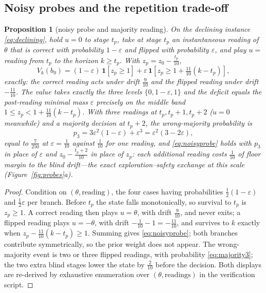 \documentclass[11pt,a4paper]{article}
\theoremstyle{plain}
\newtheorem{proposition}[theorem]{Proposition}
\theoremstyle{definition}
\theoremstyle{remark}
\newcommand{\ind}[1]{\mathbf{1}[#1]}
\newcommand{\tfr}[2]{\tfrac{#1}{#2}}
\begin{document}
\subsection{Noisy probes and the repetition trade-off}

\begin{proposition}[noisy probe and majority reading]\label{prop:noisyprobe}
On the declining instance \eqref{eq:declining}, hold $u=0$ to stage $t_p$, take at stage $t_p$ an instantaneous reading of $\theta$ that is correct with probability $1-\varepsilon$ and flipped with probability $\varepsilon$, and play $u=$ reading from $t_p$ to the horizon $k\ge t_p$. With $z_p=z_0-\tfr{t_p}{10}$,
\begin{equation}\label{eq:noisyprobe}
V_k(b_0)=(1-\varepsilon)\,\ind{z_p\ge1}+\varepsilon\,\ind{z_p\ge1+\tfr{11}{10}(k-t_p)} ,
\end{equation}
exactly: the correct reading acts under drift $\tfr9{10}$ and the flipped reading under drift $-\tfr{11}{10}$. The value takes exactly the three levels $\{0,1-\varepsilon,1\}$ and the deficit equals the post-reading minimal mass $\varepsilon$ precisely on the middle band $1\le z_p<1+\tfr{11}{10}(k-t_p)$. With three readings at $t_p,t_p+1,t_p+2$ ($u=0$ meanwhile) and a majority decision at $t_p+2$, the wrong-majority probability is
\begin{equation}\label{eq:majority3}
p_3=3\varepsilon^{2}(1-\varepsilon)+\varepsilon^{3}=\varepsilon^{2}(3-2\varepsilon),
\end{equation}
equal to $\tfr7{250}$ at $\varepsilon=\tfr1{10}$ against $\tfr1{10}$ for one reading, and \eqref{eq:noisyprobe} holds with $p_3$ in place of $\varepsilon$ and $z_0-\tfr{t_p+2}{10}$ in place of $z_p$: each additional reading costs $\tfr1{10}$ of floor margin to the blind drift---the exact exploration--safety exchange at this scale (Figure~\ref{fig:probes}a).
\end{proposition}

\begin{proof}
Condition on $(\theta,\text{reading})$, the four cases having probabilities $\tfr12(1-\varepsilon)$ and $\tfr12\varepsilon$ per branch. Before $t_p$ the state falls monotonically, so survival to $t_p$ is $z_p\ge1$. A correct reading then plays $u=\theta$, with drift $\tfr9{10}$, and never exits; a flipped reading plays $u=-\theta$, with drift $-\tfr1{10}-1=-\tfr{11}{10}$, and survives to $k$ exactly when $z_p-\tfr{11}{10}(k-t_p)\ge1$. Summing gives \eqref{eq:noisyprobe}; both branches contribute symmetrically, so the prior weight does not appear. The wrong-majority event is two or three flipped readings, with probability \eqref{eq:majority3}; the two extra blind stages lower the state by $\tfr2{10}$ before the decision. Both displays are re-derived by exhaustive enumeration over $(\theta,\text{readings})$ in the verification script.
\end{proof}
\end{document}
